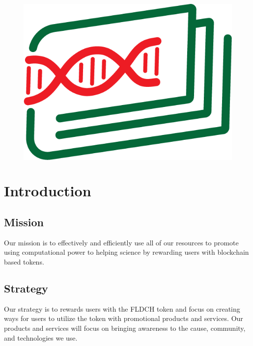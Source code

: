 \documentclass[letterpaper,12pt,titlepage]{article}
\title{\org}
\author{Miguel Molina Jr.}
\date{\today\\v0.0.0}
\def\org{FoldingCash}
\def\ticker{FLDCH}
\begin{document}
\begin{figure}
    \centering
    \includegraphics[width=0.5\linewidth]{FoldingCash_Logo.png}
\end{figure}
\maketitle

\begin{abstract}
    The \org{} organization was created to incentivize FAH's users to use their time, hardware (GPU), and electricity to continue and grow the amount of research that is being performed using the distributed model. The \ticker{} token is built using BitcoinCash's CashTokens technology because we believe that BCH will continue to be an affordable blockchain to transact on and are scaling in a pragmatic way. \org{} will distribute the token but our focus is on providing utility to the token which we believe will increase people's desire to earn the token.
\end{abstract}

\section{Introduction}

\subsection{Mission}
Our mission is to effectively and efficiently use all of our resources to promote using computational power to helping science by rewarding users with blockchain based tokens.

\subsection{Strategy}
Our strategy is to rewards users with the \ticker{} token and focus on creating ways for users to utilize the token with promotional products and services. Our products and services will focus on bringing awareness to the cause, community, and technologies we use.
\end{document}
